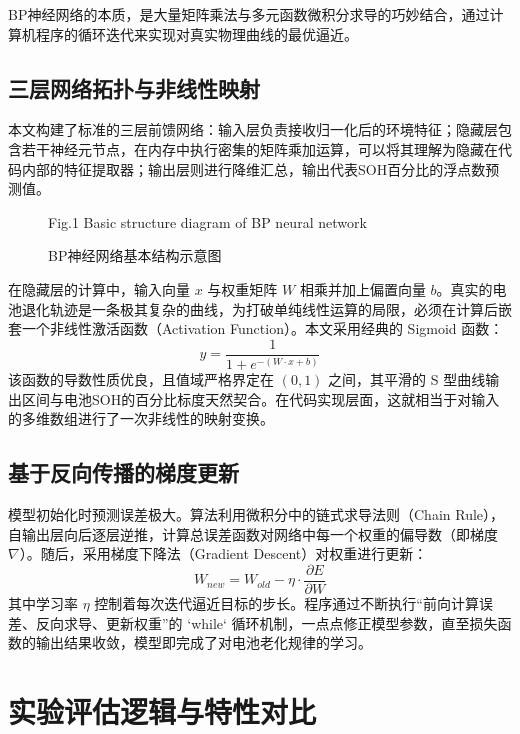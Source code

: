 \documentclass[a4paper,10.5pt]{article}
\begin{document}
BP神经网络的本质，是大量矩阵乘法与多元函数微积分求导的巧妙结合，通过计算机程序的循环迭代来实现对真实物理曲线的最优逼近。

\subsection{三层网络拓扑与非线性映射}
本文构建了标准的三层前馈网络：输入层负责接收归一化后的环境特征；隐藏层包含若干神经元节点，在内存中执行密集的矩阵乘加运算，可以将其理解为隐藏在代码内部的特征提取器；输出层则进行降维汇总，输出代表SOH百分比的浮点数预测值。

\begin{figure}[htbp]
    \centering
    \caption{BP神经网络基本结构示意图}
    \vspace{0.5ex}
    \centerline{ Fig.1 Basic structure diagram of BP neural network}
\end{figure}

在隐藏层的计算中，输入向量 $x$ 与权重矩阵 $W$ 相乘并加上偏置向量 $b$。真实的电池退化轨迹是一条极其复杂的曲线，为打破单纯线性运算的局限，必须在计算后嵌套一个非线性激活函数（Activation Function）。本文采用经典的 Sigmoid 函数：
\begin{equation}
    y=\frac{1}{1+e^{-(W \cdot x+b)}}
\end{equation}
该函数的导数性质优良，且值域严格界定在 $(0,1)$ 之间，其平滑的 S 型曲线输出区间与电池SOH的百分比标度天然契合。在代码实现层面，这就相当于对输入的多维数组进行了一次非线性的映射变换。

\subsection{基于反向传播的梯度更新}
模型初始化时预测误差极大。算法利用微积分中的链式求导法则（Chain Rule），自输出层向后逐层逆推，计算总误差函数对网络中每一个权重的偏导数（即梯度 $\nabla$）。随后，采用梯度下降法（Gradient Descent）对权重进行更新：
\begin{equation}
    W_{new} = W_{old} - \eta \cdot \frac{\partial E}{\partial W}
\end{equation}
其中学习率 $\eta$ 控制着每次迭代逼近目标的步长。程序通过不断执行“前向计算误差、反向求导、更新权重”的 `while` 循环机制，一点点修正模型参数，直至损失函数的输出结果收敛，模型即完成了对电池老化规律的学习。

\section{实验评估逻辑与特性对比}
\end{document}

